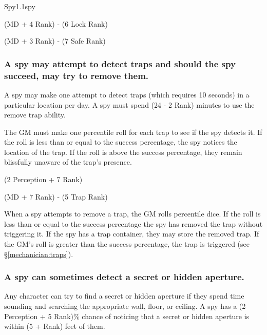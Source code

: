 \begin{skill}{Spy}{1.1}{spy}
\begin{Description}

\item[For Spy to Pick Lock] (MD + 4 \x Rank) - (6 \x Lock Rank)

\item[For Spy to Open Safe] (MD + 3 \x Rank) - (7 \x Safe Rank)

\end{Description}

\subsubsection{A spy may attempt to detect traps and should the spy
succeed, may try to remove them.}
\label{spy:removetraps}

A spy may make one attempt to detect traps (which requires 10 seconds)
in a particular location per day.  A spy must spend (24 - 2 \x Rank)
minutes to use the remove trap ability.

The GM must make one percentile roll for each trap to see if the spy
detects it. If the roll is less than or equal to the success
percentage, the spy notices the location of the trap. If the roll is
above the success percentage, they remain blissfully unaware of the
trap's presence.

\begin{Description}

\item[For Spy to Detect Trap] (2 \x Perception + 7 \x Rank)

\item[For Spy to Remove Trap] (MD + 7 \x Rank) - (5 \x Trap Rank)

\end{Description}

When a spy attempts to remove a trap, the GM rolls percentile dice.
If the roll is less than or equal to the success percentage the spy
has removed the trap without triggering it. If the spy has a trap
container, they may store the removed trap. If the GM's roll is
greater than the success percentage, the trap is triggered (see
\S\ref{mechanician:traps}).

\subsubsection{A spy can sometimes detect a secret or hidden aperture.}

Any character can try to find a secret or hidden aperture if they spend
time sounding and searching the appropriate wall, floor, or ceiling. A
spy has a (2 \x Perception + 5 \x Rank)\% chance of noticing that a
secret or hidden aperture is within (5 + Rank) feet of them.


\end{skill}
